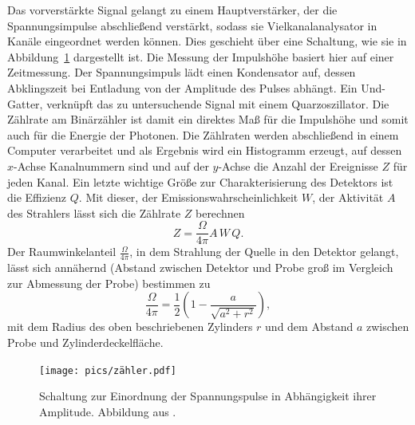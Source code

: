 Das vorverstärkte Signal gelangt zu einem Hauptverstärker, der die Spannungsimpulse abschließend verstärkt, sodass 
sie Vielkanalanalysator in Kanäle eingeordnet werden können. Dies geschieht über eine Schaltung, wie sie in 
Abbildung~\ref{fig: zaehler}
dargestellt ist. Die Messung der Impulshöhe basiert hier auf einer Zeitmessung. Der Spannungsimpuls lädt einen 
Kondensator auf, dessen Abklingszeit bei Entladung von der Amplitude des Pulses abhängt. Ein Und-Gatter, verknüpft 
das zu untersuchende Signal mit einem Quarzoszillator. Die Zählrate am Binärzähler ist damit ein direktes Maß für 
die Impulshöhe und somit auch für die Energie der Photonen. 
Die Zählraten werden abschließend in einem Computer verarbeitet und als Ergebnis wird ein Histogramm erzeugt, auf dessen 
$x$-Achse Kanalnummern sind und auf der $y$-Achse die Anzahl der Ereignisse $Z$ für jeden Kanal. 
Ein letzte wichtige Größe zur Charakterisierung des Detektors ist 
die Effizienz $Q$. Mit dieser, der Emissionswahrscheinlichkeit $W$, der Aktivität $A$ des Strahlers lässt sich die 
Zählrate $Z$ berechnen 
\begin{equation}
    Z = \frac{\Omega}{4\pi} A \, W \, Q.
    \label{eq: zählrate}
\end{equation}
Der Raumwinkelanteil $\frac{\Omega}{4\pi}$, in dem Strahlung der Quelle in den Detektor gelangt, lässt sich annähernd (Abstand zwischen 
Detektor und Probe groß im Vergleich zur Abmessung der Probe) bestimmen zu 
\begin{equation}
    \frac{\Omega}{4\pi} = \frac{1}{2} \left( 1 - \frac{a}{\sqrt{a^2 + r^2}} \right),
    \label{eq: omega}
\end{equation}
mit dem Radius des oben beschriebenen Zylinders $r$ und dem Abstand $a$ zwischen Probe und Zylinderdeckelfläche. 
\begin{figure}
    \centering
    \texttt{[image: pics/zähler.pdf]}
    \caption{Schaltung zur Einordnung der Spannungspulse in Abhängigkeit ihrer Amplitude. Abbildung aus \cite{anleitungv18}.}
    \label{fig: zaehler}
\end{figure}

